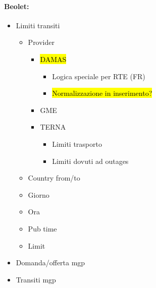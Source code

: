     \paragraph{Beolet:}
        \begin{itemize}
            \item Limiti transiti
                \begin{itemize}
                    \item Provider
                        \begin{itemize}
                            \item \hl{DAMAS} \label{todo:damas}
                                \begin{itemize}
                                    \item Logica speciale per RTE (FR)
                                    \item \hl{Normalizzazione in inserimento?}
                                \end{itemize}
                            \item GME
                            \item TERNA
                                \begin{itemize}
                                    \item Limiti trasporto
                                    \item Limiti dovuti ad outages
                                \end{itemize}
                        \end{itemize}
                    \item Country from/to
                    \item Giorno
                    \item Ora
                    \item Pub time
                    \item Limit
                \end{itemize}
            \item Domanda/offerta mgp
            \item Transiti mgp
        \end{itemize}